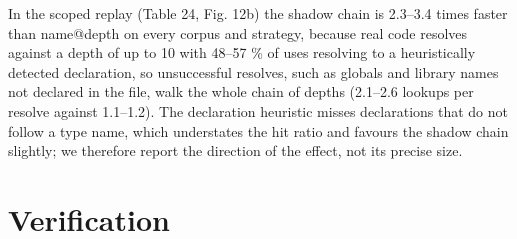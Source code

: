 \documentclass{ieeeaccess}
\begin{document}
\begin{table}[!t]
\caption{Block-scoped replay of real code, djb2: median ns per scope operation for both designs, and table lookups per resolve in the last row (the shadow-chain count includes the lookup made by each declaration).}
\label{tab:24}
\centering
\scriptsize
{}
\end{table}


In the scoped replay (Table 24, Fig. 12b) the shadow chain is 2.3--3.4 times faster than name@depth on every corpus and strategy, because real code resolves against a depth of up to 10 with 48--57 \% of uses resolving to a heuristically detected declaration, so unsuccessful resolves, such as globals and library names not declared in the file, walk the whole chain of depths (2.1--2.6 lookups per resolve against 1.1--1.2). The declaration heuristic misses declarations that do not follow a type name, which understates the hit ratio and favours the shadow chain slightly; we therefore report the direction of the effect, not its precise size.

\section{Verification}
\end{document}
